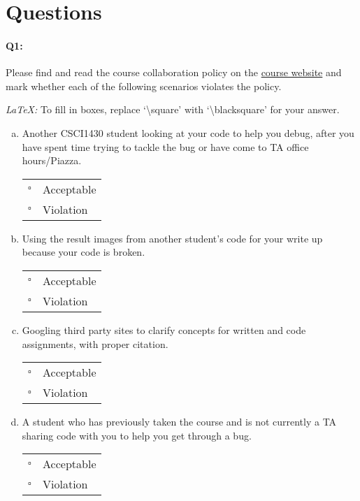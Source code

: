 \documentclass[11pt]{article}
\begin{document}
\section*{Questions}

\paragraph{Q1:} Please find and read the course collaboration policy on the \href{http://cs.brown.edu/courses/csci1430/}{course website} and mark whether each of the following scenarios violates the policy. 

\emph{LaTeX:} To fill in boxes, replace `\textbackslash square' with `\textbackslash blacksquare' for your answer.

\begin{enumerate}[(a)]
\item 
Another CSCI1430 student looking at your code to help you debug, after you have spent time trying to tackle the bug or have come to TA office hours/Piazza.

\begin{tabular}[h]{ll}
$\square$ & Acceptable \\
$\square$ & Violation \\
\end{tabular}

\item 
Using the result images from another student's code for your write up because your code is broken.

\begin{tabular}[h]{ll}
$\square$ & Acceptable \\
$\square$ & Violation \\
\end{tabular}

\item 
Googling third party sites to clarify concepts for written and code assignments, with proper citation.

\begin{tabular}[h]{ll}
$\square$ & Acceptable \\
$\square$ & Violation \\
\end{tabular}

\item 
A student who has previously taken the course and is not currently a TA sharing code with you to help you get through a bug.

\begin{tabular}[h]{ll}
$\square$ & Acceptable \\
$\square$ & Violation \\
\end{tabular}

\end{enumerate}
\end{document}
